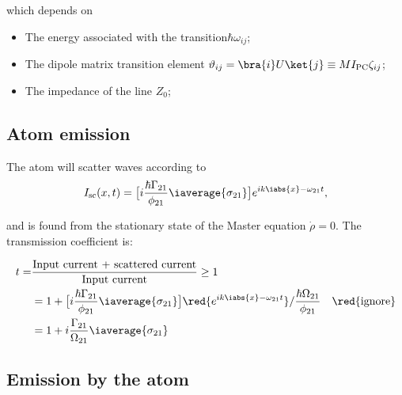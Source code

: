  \noindent which depends on
 \begin{itemize}
 \item The energy associated with the transition\hfill $ \hbar\omega_{ij} $;
 \item      The      dipole       matrix      transition      element      \hfill
   $ \vartheta_{ij} = \bra{i}U\ket{j} \equiv MI_\text{PC}\zeta_{ij}$;
 \item The impedance of the line \hfill $ Z_0 $;
 \end{itemize}

\subsection{Atom emission}
The atom will scatter waves according to
\[
  I_\text{sc}(x,t)                                                              =
  \big[i\frac{\hbar\Gamma_{21}}{\phi_{21}}\iaverage{\sigma_{21}}\big]e^{ik\iabs{x}-\omega_{21}t},
\]

\noindent and  is found from  the stationary state of the Master
equation $ \dot{\rho} = 0 $. The transmission coefficient is:

\[
  \begin{aligned}
    t = & \frac{\text{Input current + scattered current}}{\text{Input current}} \ge 1\\
    & = 1 + \big[i\frac{\hbar\Gamma_{21}}{\phi_{21}}\iaverage{\sigma_{21}}\big]\red{e^{ik\iabs{x}-\omega_{21}t}}/\frac{\hbar\Omega_{21}}{\phi_{21}}\quad \red{\text{ignore}}\\
    & = 1 + i\frac{\Gamma_{21}}{\Omega_{21}}\iaverage{\sigma_{21}}
  \end{aligned}
\]


\subsection{Emission by the atom\label{subsec:Scattering}}  

